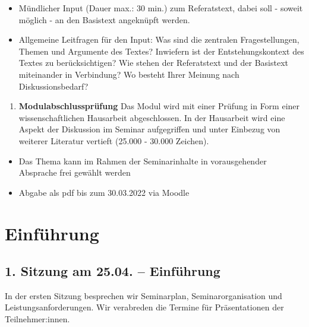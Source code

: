 \documentclass[
  ngerman,
]{article}
\providecommand{\tightlist}{%
  \setlength{\itemsep}{0pt}\setlength{\parskip}{0pt}}
\begin{document}
\begin{itemize}
\tightlist
\item
  Mündlicher Input (Dauer max.: 30 min.) zum Referatstext, dabei soll - soweit möglich - an den Basistext angeknüpft werden.
\item
  Allgemeine Leitfragen für den Input: Was sind die zentralen Fragestellungen, Themen und Argumente des Textes? Inwiefern ist der Entstehungskontext des Textes zu berücksichtigen? Wie stehen der Referatstext und der Basistext miteinander in Verbindung? Wo besteht Ihrer Meinung nach Diskussionsbedarf?
\end{itemize}

\begin{enumerate}
\def\labelenumi{\arabic{enumi}.}
\setcounter{enumi}{3}
\tightlist
\item
  \textbf{Modulabschlussprüfung} Das Modul wird mit einer Prüfung in Form einer wissenschaftlichen Hausarbeit abgeschlossen. In der Hausarbeit wird eine Aspekt der Diskussion im Seminar aufgegriffen und unter Einbezug von weiterer Literatur vertieft (25.000 - 30.000 Zeichen).
\end{enumerate}

\begin{itemize}
\tightlist
\item
  Das Thema kann im Rahmen der Seminarinhalte in vorausgehender Absprache frei gewählt werden
\item
  Abgabe als pdf bis zum 30.03.2022 via Moodle
\end{itemize}

\pagebreak

\hypertarget{einfuxfchrung}{%
\section*{Einführung}\label{einfuxfchrung}}

\hypertarget{sitzung-am-25.04.-einfuxfchrung}{%
\subsection*{1. Sitzung am 25.04. -- Einführung}\label{sitzung-am-25.04.-einfuxfchrung}}

In der ersten Sitzung besprechen wir Seminarplan, Seminarorganisation und Leistungsanforderungen. Wir verabreden die Termine für Präsentationen der Teilnehmer:innen.
\end{document}
